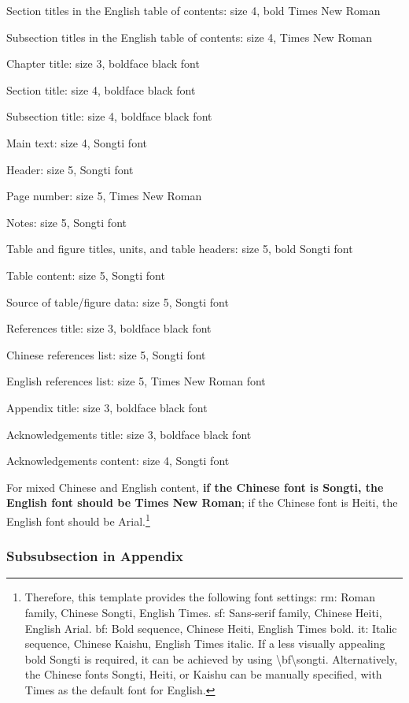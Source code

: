 \documentclass{xmu}
\begin{document}
\begin{appendix}
    Section titles in the English table of contents: size 4, bold Times New Roman

    Subsection titles in the English table of contents: size 4, Times New Roman

    Chapter title: size 3, boldface black font

    Section title: size 4, boldface black font

    Subsection title: size 4, boldface black font

    Main text: size 4, Songti font

    Header: size 5, Songti font

    Page number: size 5, Times New Roman

    Notes: size 5, Songti font

    Table and figure titles, units, and table headers: size 5, bold Songti font

    Table content: size 5, Songti font

    Source of table/figure data: size 5, Songti font

    References title: size 3, boldface black font

    Chinese references list: size 5, Songti font

    English references list: size 5, Times New Roman font

    Appendix title: size 3, boldface black font

    Acknowledgements title: size 3, boldface black font

    Acknowledgements content: size 4, Songti font

    For mixed Chinese and English content, {\bf\songti if the Chinese font is Songti, the English font should be Times New Roman}; {\sf if the Chinese font is Heiti, the English font should be Arial}.\footnote{
    Therefore, this template provides the following font settings: rm: Roman family, Chinese Songti, English Times. sf: Sans-serif family, Chinese Heiti, English Arial. bf: Bold sequence, Chinese Heiti, English Times bold. it: Italic sequence, Chinese Kaishu, English Times italic. If a less visually appealing bold Songti is required, it can be achieved by using \textbackslash bf\textbackslash songti. Alternatively, the Chinese fonts Songti, Heiti, or Kaishu can be manually specified, with Times as the default font for English.
    }
    \subsubsection{Subsubsection in Appendix}
\end{appendix}
\end{document}

